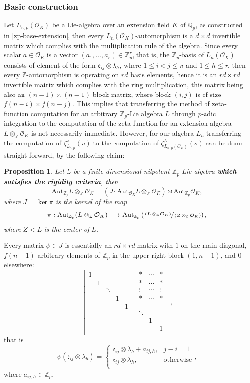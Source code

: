 \documentclass{article}
\newtheorem{proposition4}[paragraph]{Proposition}
\newcommand{\e}{\mathfrak{e}}
\begin{document}
\subsubsection{Basic construction}
Let $L_{n,p}(\mathcal{O}_K)$ be a Lie-algebra over an extension field $K$ of $\mathbb{Q}_p$, as constructed in \ref{zp-base-extension}, then every $L_n(\mathcal{O}_K)$-automorphism is a $d\times{d}$ invertible matrix which complies with the multiplication rule of the algebra.
Since every scalar $a\in\mathcal{O}_K$ is a vector $(a_1,\dots,a_r)\in\mathbb{Z}_p^r$, that is, the $\mathbb{Z}_p$-basis of $L_n(\mathcal{O}_K)$ consists of element of the form $\e_{ij}\otimes\lambda_h$, where $1\leq{i}<j\leq{n}$ and $1\leq{h}\leq{r}$, then every $\mathbb{Z}$-automorphism is operating on $rd$ basis elements, hence it is an $rd\times{r}d$ invertible matrix which complies with the ring multiplication, this matrix being also an $(n-1)\times(n-1)$ block matrix, where block $(i,j)$ is of size $f(n-i)\times{f}(n-j)$.
This implies that transferring the method of zeta-function computation for an arbitrary $\mathbb{Z}_p$-Lie algebra $L$ through $p$-adic integration to the computation of the zeta-function for an extension algebra $L\otimes_\mathbb{Z}\mathcal{O}_K$ is not necessarily immediate.
However, for our algebra $L_n$ transferring the computation of $\zeta_{L_{n,p}}^{\wedge}(s)$ to the computation of $\zeta_{L_{n,p}(\mathcal{O}_K)}^{\wedge}(s)$ can be done straight forward, by the following claim:
\begin{proposition4}
Let $L$ be a finite-dimensional nilpotent $\mathbb{Z}_p$-Lie algebra \textbf{which satisfies the rigidity criteria}, then 
\[
\text{Aut}_{\mathbb{Z}_p}L\otimes_\mathbb{Z}\mathcal{O}_K=\left(J\cdot\text{Aut}_{\mathcal{O}_K}L\otimes_\mathbb{Z}\mathcal{O}_K\right)\rtimes\text{Aut}_{\mathbb{Z}_p}\mathcal{O}_K,
\]
where $J=\ker\pi$ is the kernel of the map \[
\pi:\text{Aut}_{\mathbb{Z}_p}(L\otimes_\mathbb{Z}\mathcal{O}_K)\longrightarrow\text{Aut}_{\mathbb{Z}_p}\left(\sfrac{\left(L\otimes_\mathbb{Z}\mathcal{O}_K\right)}{\left(Z\otimes_\mathbb{Z}\mathcal{O}_K\right)}\right),\]
where $Z<L$ is the center of $L$.
\end{proposition4}
Every matrix $\psi\in{J}$ is essentially an $rd\times{rd}$ matrix with $1$ on the main diagonal, $f(n-1)$ arbitrary elements of $\mathbb{Z}_p$ in the upper-right block $(1,n-1)$, and $0$ elsewhere:
\[
\begin{bmatrix}
1&&&&&&*&\cdots&*\\
&1&&&&&*&\cdots&*\\
&&\ddots&&&&\vdots&\cdots&\vdots\\
&&&1&&&*&\cdots&*\\
&&&&1&&&&\\
&&&&&&\ddots&&\\
&&&&&&&1&\\
&&&&&&&&1\\
\end{bmatrix},
\]
that is 
\[\psi(\e_{ij}\otimes\lambda_h)=\begin{cases}
\e_{ij}\otimes\lambda_h+a_{ij,h},&j-i=1\\
\e_{ij}\otimes\lambda_h,&\text{otherwise}\\
\end{cases},
\]
where $a_{ij,h}\in\mathbb{Z}_p$.
\end{document}
